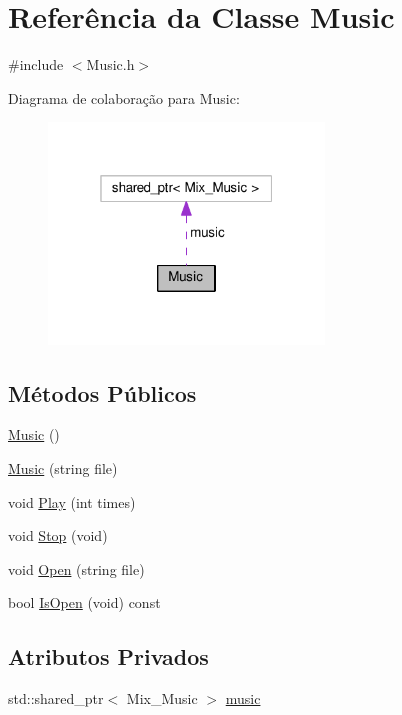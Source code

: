 \hypertarget{classMusic}{\section{Referência da Classe Music}
\label{classMusic}
}


{\ttfamily \#include $<$Music.\+h$>$}



Diagrama de colaboração para Music\+:\nopagebreak
\begin{figure}[H]
\begin{center}
\leavevmode
\includegraphics[width=208pt]{classMusic__coll__graph}
\end{center}
\end{figure}
\subsection*{Métodos Públicos}
\begin{DoxyCompactItemize}
\item 
\hyperlink{classMusic_ab5143f67c021bc77894c8e91de2b916b}{Music} ()
\item 
\hyperlink{classMusic_a769113513e796dd408b4deb7e758074d}{Music} (string file)
\item 
void \hyperlink{classMusic_a0b0eeff26dedfaab92bd127bce028b9a}{Play} (int times)
\item 
void \hyperlink{classMusic_a76ee0c7654f3048045e1f1b7fde334c3}{Stop} (void)
\item 
void \hyperlink{classMusic_ae13bd9609c4bb402a04f53ec07890aa3}{Open} (string file)
\item 
bool \hyperlink{classMusic_a7dd0d191e358d600f0ea8a1db75f833d}{Is\+Open} (void) const 
\end{DoxyCompactItemize}
\subsection*{Atributos Privados}
\begin{DoxyCompactItemize}
\item 
std\+::shared\+\_\+ptr$<$ Mix\+\_\+\+Music $>$ \hyperlink{classMusic_a6cddb36711f395497d2daf3e3c955912}{music}
\end{DoxyCompactItemize}


